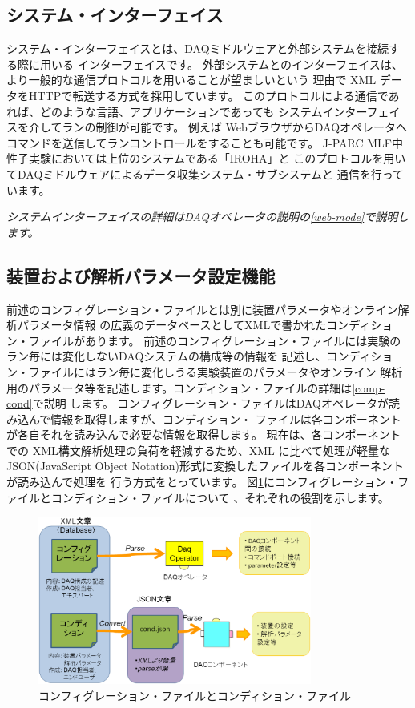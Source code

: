 \documentclass[a4j,10pt,dvips,onecolumn,oneside,final]{jarticle}%
\begin{document}
\subsection{システム・インターフェイス}\label{sysint}
システム・インターフェイスとは、DAQミドルウェアと外部システムを接続する際に用いる
インターフェイスです。
外部システムとのインターフェイスは、より一般的な通信プロトコルを用いることが望ましいという
理由で XML データをHTTPで転送する方式を採用しています。
このプロトコルによる通信であれば、どのような言語、アプリケーションであっても
システムインターフェイスを介してランの制御が可能です。
例えば WebブラウザからDAQオペレータへコマンドを送信してランコントロールをすることも可能です。
J-PARC MLF中性子実験においては上位のシステムである「IROHA」と
このプロトコルを用いてDAQミドルウェアによるデータ収集システム・サブシステムと
通信を行っています。

{\it
システムインターフェイスの詳細はDAQオペレータの説明の\ref{web-mode}で説明します。
}

\subsection{装置および解析パラメータ設定機能}\label{cond}
前述のコンフィグレーション・ファイルとは別に装置パラメータやオンライン解析パラメータ情報
の広義のデータベースとしてXMLで書かれたコンディション・ファイルがあります。
前述のコンフィグレーション・ファイルには実験のラン毎には変化しないDAQシステムの構成等の情報を
記述し、コンディション・ファイルにはラン毎に変化しうる実験装置のパラメータやオンライン
解析用のパラメータ等を記述します。コンディション・ファイルの詳細は\ref{comp-cond}で説明
します。
コンフィグレーション・ファイルはDAQオペレータが読み込んで情報を取得しますが、コンディション・
ファイルは各コンポーネントが各自それを読み込んで必要な情報を取得します。
現在は、各コンポーネントでの XML構文解析処理の負荷を軽減するため、XML に比べて処理が軽量な 
JSON(JavaScript Object Notation)形式に変換したファイルを各コンポーネントが読み込んで処理を
行う方式をとっています。
図\ref{condition.fig}にコンフィグレーション・ファイルとコンディション・ファイルについて
、それぞれの役割を示します。
\begin{figure}[htbp]
 \begin{center}
  \includegraphics[width=90mm]{condition.eps}
  \caption{コンフィグレーション・ファイルとコンディション・ファイル}
  \label{condition.fig}
 \end{center}
\end{figure}
\end{document}
